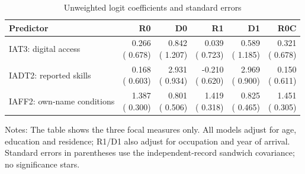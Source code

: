 \begin{table}[tbp]\centering\small
\caption{Unweighted logit coefficients and standard errors}\label{tab:det-coefficients}
\begin{tabular}{lrrrrr}\toprule Predictor & R0 & D0 & R1 & D1 & R0C \\
\midrule
IAT3: digital access & \shortstack{  0.266\\(  0.678)} & \shortstack{  0.842\\(  1.207)} & \shortstack{  0.039\\(  0.723)} & \shortstack{  0.589\\(  1.185)} & \shortstack{  0.321\\(  0.678)} \\
IADT2: reported skills & \shortstack{  0.168\\(  0.603)} & \shortstack{  2.931\\(  0.934)} & \shortstack{ -0.210\\(  0.620)} & \shortstack{  2.969\\(  0.900)} & \shortstack{  0.150\\(  0.611)} \\
IAFF2: own-name conditions & \shortstack{  1.387\\(  0.300)} & \shortstack{  0.801\\(  0.506)} & \shortstack{  1.419\\(  0.318)} & \shortstack{  0.825\\(  0.465)} & \shortstack{  1.451\\(  0.305)} \\
\bottomrule\end{tabular}
\par\smallskip\begin{minipage}{0.96\linewidth}\footnotesize\raggedright Notes: The table shows the three focal measures only. All models adjust for age, education and residence; R1/D1 also adjust for occupation and year of arrival. Standard errors in parentheses use the independent-record sandwich covariance; no significance stars. \end{minipage}\end{table}

